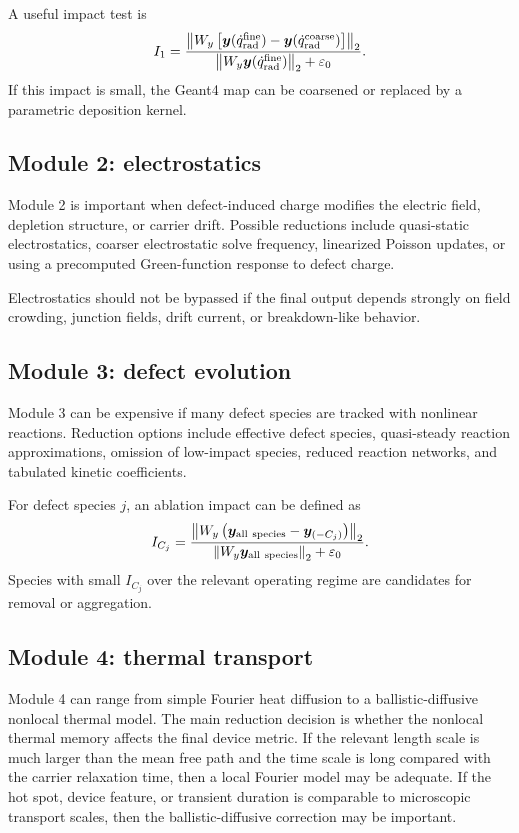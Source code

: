 \documentclass[11pt]{article}
\begin{document}
A useful impact test is
\begin{equation}
    I_1
    =
    \frac{\norm{W_y\left[\bm{y}(\dot{q}_{\mathrm{rad}}^{\mathrm{fine}})-\bm{y}(\dot{q}_{\mathrm{rad}}^{\mathrm{coarse}})\right]}_2}
    {\norm{W_y\bm{y}(\dot{q}_{\mathrm{rad}}^{\mathrm{fine}})}_2+\varepsilon_0}.
    \label{eq:module1_source_resolution_impact}
\end{equation}
If this impact is small, the Geant4 map can be coarsened or replaced by a parametric deposition kernel.

\subsection{Module 2: electrostatics}
Module 2 is important when defect-induced charge modifies the electric field, depletion structure, or carrier drift. Possible reductions include quasi-static electrostatics, coarser electrostatic solve frequency, linearized Poisson updates, or using a precomputed Green-function response to defect charge.

Electrostatics should not be bypassed if the final output depends strongly on field crowding, junction fields, drift current, or breakdown-like behavior.

\subsection{Module 3: defect evolution}
Module 3 can be expensive if many defect species are tracked with nonlinear reactions. Reduction options include effective defect species, quasi-steady reaction approximations, omission of low-impact species, reduced reaction networks, and tabulated kinetic coefficients.

For defect species \(j\), an ablation impact can be defined as
\begin{equation}
    I_{C_j}
    =
    \frac{\norm{W_y\left(\bm{y}_{\mathrm{all\ species}}-\bm{y}_{(-C_j)}\right)}_2}
    {\norm{W_y\bm{y}_{\mathrm{all\ species}}}_2+\varepsilon_0}.
    \label{eq:defect_species_impact}
\end{equation}
Species with small \(I_{C_j}\) over the relevant operating regime are candidates for removal or aggregation.

\subsection{Module 4: thermal transport}
Module 4 can range from simple Fourier heat diffusion to a ballistic-diffusive nonlocal thermal model. The main reduction decision is whether the nonlocal thermal memory affects the final device metric. If the relevant length scale is much larger than the mean free path and the time scale is long compared with the carrier relaxation time, then a local Fourier model may be adequate. If the hot spot, device feature, or transient duration is comparable to microscopic transport scales, then the ballistic-diffusive correction may be important.
\end{document}
